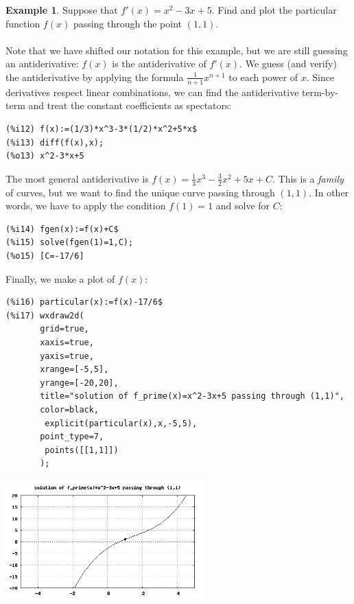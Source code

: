 \documentclass[10.5pt,twoside]{report}
\theoremstyle{definition}
\newtheorem{exmp}{Example}[section]
\begin{document}
\begin{exmp}  Suppose that $f'(x)=x^2-3x+5$.  Find and plot the particular function $f(x)$ passing through the point $(1,1)$.\\
${}$\\

Note that we have shifted our notation for this example, but we are still guessing an antiderivative:  $f(x)$ is the antiderivative of $f'(x)$.  We guess (and verify) the antiderivative by applying the formula $\frac{1}{n+1} x^{n+1}$ to each power of $x$.  Since derivatives respect linear combinations, we can find the antiderivative term-by-term and treat the constant coefficients as spectators:


\begin{verbatim}
(%i12) f(x):=(1/3)*x^3-3*(1/2)*x^2+5*x$
(%i13) diff(f(x),x);
(%o13) x^2-3*x+5
\end{verbatim}

The most general antiderivative is $f(x)=\frac{1}{3}x^3-\frac{3}{2}x^2+5x+C$.  This is a \textit{family} of curves, but we want to find the unique curve passing through $(1,1)$.  In other words, we have to apply the condition $f(1)=1$ and solve for $C$:

\begin{verbatim}
(%i14) fgen(x):=f(x)+C$
(%i15) solve(fgen(1)=1,C);
(%o15) [C=-17/6]
\end{verbatim}

Finally, we make a plot of $f(x)$:

\begin{verbatim}
(%i16) particular(x):=f(x)-17/6$
(%i17) wxdraw2d(
       grid=true,
       xaxis=true,
       yaxis=true,
       xrange=[-5,5],
       yrange=[-20,20],
       title="solution of f_prime(x)=x^2-3x+5 passing through (1,1)",
       color=black,
        explicit(particular(x),x,-5,5),
       point_type=7,
        points([[1,1]])
       );
\end{verbatim}

\includegraphics[width=3in]{example_7_1_4}

\end{exmp}
\end{document}
